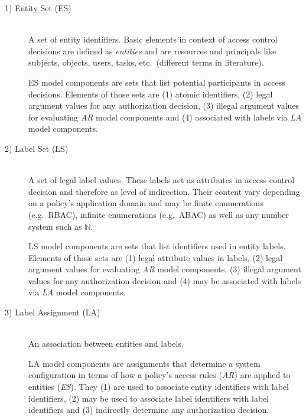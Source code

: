 \documentclass[twoside, openright, 12pt]{book}
\begin{document}
\begin{description}
\item[1) Entity Set (ES)]\hfill \\
A set of entity identifiers.
Basic elements in context of access control decisions are defined as \textit{entities} and are resources and principals like subjects, objects, users, tasks, etc.~(different terms in literature).
\vspace{-2mm}

\begin{xdefinition}[ES] 
ES model components are sets that list potential participants in access decisions.
Elements of those sets are (1) atomic identifiers, (2) legal argument values for any authorization decision, (3) illegal argument values for evaluating \textit{AR} model components and (4) associated with labels via \textit{LA} model components.
\label{definition:ES}
\end{xdefinition}

\item[2) Label Set (LS)]\hfill \\
A set of legal label values.
These labels act as attributes in access control decision and therefore as level of indirection.
Their content vary depending on a policy's application domain and may be finite enumerations (e.g.~RBAC), infinite enumerations (e.g.~ABAC) as well as any number system such as $\mathbb{N}$.
\vspace{-2mm}

\begin{xdefinition}[LS] 
LS model components are sets that list identifiers used in entity labels.
Elements of those sets are (1) legal attribute values in labels, (2) legal argument values for evaluating \textit{AR} model components, (3) illegal argument values for any authorization decision and (4) may be associated with labels via \textit{LA} model components.
\label{definition:LS}
\end{xdefinition}



\item[3) Label Assignment (LA)]\hfill \\
An association between entities and labels.
\vspace{-2mm}

\begin{xdefinition}[LA] 
LA model components are assignments that determine a system configuration in terms of how a policy's access rules (\textit{AR}) are applied to entities (\textit{ES}). They (1) are used to associate entity identifiers with label identifiers, (2) may be used to associate label identifiers with label identifiers and (3) indirectly determine any authorization decision.
\label{definition:LA}
\end{xdefinition}




\end{description}
\end{document}
